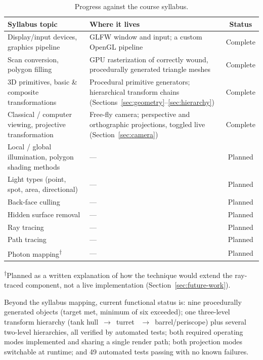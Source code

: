 \documentclass[11pt,a4paper]{article}
\begin{document}
\begin{table}[H]
\centering
\caption{Progress against the course syllabus.}
\label{tab:status}
\begin{tabular}{p{6.2cm}p{5.2cm}c}
\toprule
\textbf{Syllabus topic} & \textbf{Where it lives} & \textbf{Status} \\
\midrule
Display/input devices, graphics pipeline & GLFW window and input; a
custom OpenGL pipeline & Complete \\
Scan conversion, polygon filling & GPU rasterization of correctly wound,
procedurally generated triangle meshes & Complete \\
3D primitives, basic \& composite transformations & Procedural
primitive generators; hierarchical transform chains
(Sections~\ref{sec:geometry}--\ref{sec:hierarchy}) & Complete \\
Classical / computer viewing, projective transformation & Free-fly
camera; perspective and orthographic projections, toggled live
(Section~\ref{sec:camera}) & Complete \\
\midrule
Local / global illumination, polygon shading methods & --- & Planned \\
Light types (point, spot, area, directional) & --- & Planned \\
Back-face culling & --- & Planned \\
Hidden surface removal & --- & Planned \\
Ray tracing & --- & Planned \\
Path tracing & --- & Planned \\
Photon mapping\textsuperscript{$\dagger$} & --- & Planned \\
\bottomrule
\end{tabular}

\vspace{0.3em}
\raggedright
\footnotesize\textsuperscript{$\dagger$}Planned as a written explanation
of how the technique would extend the ray-traced component, not a live
implementation (Section~\ref{sec:future-work}).
\end{table}

Beyond the syllabus mapping, current functional status is: nine
procedurally generated objects (target met, minimum of six exceeded);
one three-level transform hierarchy (tank hull~$\rightarrow$~turret~
$\rightarrow$~barrel/periscope) plus several two-level hierarchies,
all verified by automated tests; both required operating modes
implemented and sharing a single render path; both projection modes
switchable at runtime; and 49 automated tests passing with no known
failures.
\end{document}

